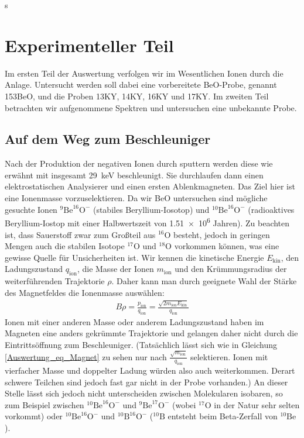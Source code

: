 s \section{Experimenteller Teil}
Im ersten Teil der Auswertung verfolgen wir im Wesentlichen Ionen durch die Anlage.
Untersucht werden soll dabei eine vorbereitete BeO-Probe, genannt \glqq 153BeO\grqq{}, und die Proben \glqq 13KY\grqq{}, \glqq 14KY\grqq{}, \glqq 16KY\grqq{} und \glqq 17KY\grqq{}.
Im zweiten Teil betrachten wir aufgenommene Spektren und untersuchen eine unbekannte Probe.

\subsection{Auf dem Weg zum Beschleuniger}
Nach der Produktion der negativen Ionen durch sputtern werden diese wie erwähnt mit insgesamt \SI{29}{\kilo\electronvolt} beschleunigt.
Sie durchlaufen dann einen elektrostatischen Analysierer und einen ersten Ablenkmagneten.
Das Ziel hier ist eine Ionenmasse vorzuselektieren.
Da wir BeO untersuchen sind mögliche gesuchte Ionen $^{9}\text{Be}^{16}\text{O}^{-}$ (stabiles Beryllium-Iosotop) und $^{10}\text{Be}^{16}\text{O}^{-}$ (radioaktives Beryllium-Iostop mit einer Halbwertszeit von \num{1.51e6} Jahren).
Zu beachten ist, dass Sauerstoff zwar zum Großteil aus $^{16}$O besteht, jedoch in geringen Mengen auch die stabilen Isotope $^{17}$O und $^{18}$O vorkommen können, was eine gewisse Quelle für Unsicherheiten ist.
Wir kennen die kinetische Energie $E_{\text{kin}}$, den Ladungszustand $q_{\text{ion}}$, die Masse der Ionen $m_{\text{ion}}$ und den Krümmungsradius der weiterführenden Trajektorie $\rho$.
Daher kann man durch geeignete Wahl der Stärke des Magnetfeldes die Ionenmasse auswählen:
\begin{gather}
    B \rho = \frac{p_{\text{ion}}}{q_{\text{ion}}} = \frac{\sqrt{2m_{\text{ion}}E_{\text{kin}}}}{q_{\text{ion}}}
    \label{Auswertung_eq_Magnet}
\end{gather}
Ionen mit einer anderen Masse oder anderem Ladungszustand haben im Magneten eine anders gekrümmte Trajektorie und gelangen daher nicht durch die Eintrittsöffnung zum Beschleuniger.
(Tatsächlich lässt sich wie in Gleichung \ref{Auswertung_eq_Magnet} zu sehen nur nach $\frac{\sqrt{m_{\text{ion}}}}{q_{\text{ion}}}$ selektieren.
Ionen mit vierfacher Masse und doppelter Ladung würden also auch weiterkommen. Derart schwere Teilchen sind jedoch fast gar nicht in der Probe vorhanden.)
An dieser Stelle lässt sich jedoch nicht unterscheiden zwischen Molekularen isobaren, so zum Beispiel zwischen $^{10}\text{Be}^{16}\text{O}^{-}$ und $^{9}\text{Be}^{17}\text{O}^{-}$ (wobei $^{17}\text{O}$ in der Natur sehr selten vorkommt) oder $^{10}\text{Be}^{16}\text{O}^{-}$ und $^{10}\text{B}^{16}\text{O}^{-}$ ($^{10}\text{B}$ entsteht beim Beta-Zerfall von $^{10}\text{Be}$).
